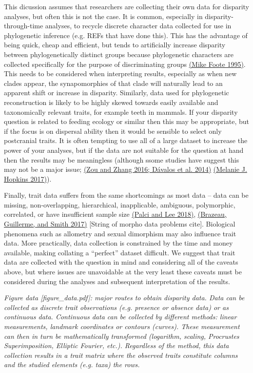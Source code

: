 This dicussion assumes that researchers are collecting their own data
for disparity analyses, but often this is not the case. It is common,
especially in disparity-through-time analyses, to recycle discrete
character data collected for use in phylogenetic inference (e.g. REFs
that have done this). This has the advantage of being quick, cheap and
efficient, but tends to artificially increase disparity between
phylogenetically distinct groups because phylogenetic characters are
collected specifically for the purpose of discriminating groups
\href{https://paperpile.com/c/sTGYvp/fTJ3}{(Mike Foote 1995)}. This
needs to be considered when interpreting results, especially as when new
clades appear, the synapomorphies of that clade will naturally lead to
an apparent shift or increase in disparity. Similarly, data used for
phylogenetic reconstruction is likely to be highly skewed towards easily
available and taxonomically relevant traits, for example teeth in
mammals. If your disparity question is related to feeding ecology or
similar then this may be appropriate, but if the focus is on dispersal
ability then it would be sensible to select only postcranial traits. It
is often tempting to use all of a large dataset to increase the power of
your analyses, but if the data are not suitable for the question at hand
then the results may be meaningless (although ssome studies have suggest
this may not be a major issue;
\href{https://paperpile.com/c/sTGYvp/ZqML+Qrba}{(Zou and Zhang 2016;
Dávalos et al. 2014)}
\href{https://paperpile.com/c/sTGYvp/xLdm}{(Melanie J. Hopkins 2017)}).

Finally, trait data suffers from the same shortcomings as most data --
data can be missing, non-overlapping, hierarchical, inapplicable,
ambiguous, polymorphic, correlated, or have insufficient sample size
\href{https://paperpile.com/c/sTGYvp/yO2t}{(Palci and Lee 2018)},
\href{https://paperpile.com/c/sTGYvp/Yrbg}{(Brazeau, Guillerme, and
Smith 2017)} {[}String of morpho data problems cite{]}. Biological
phenomena such as allometry and sexual dimorphism may also influence
trait data. More practically, data collection is constrained by the time
and money available, making collating a ``perfect'' dataset difficult.
We suggest that trait data are collected with the question in mind and
considering all of the caveats above, but where issues are unavoidable
at the very least these caveats must be considered during the analyses
and subsequent interpretation of the results.

\emph{Figure data {[}figure\_data.pdf{]}: major routes to obtain
disparity data. Data can be collected as discrete trait observations
(e.g. presence or absence data) or as continuous data. Continuous data
can be collected by different methods: linear measurements, landmark
coordinates or contours (curves). These measurement can then in turn be
mathematically transformed (logarithm, scaling, Procrustes
Superimposition, Elliptic Fourier, etc.). Regardless of the method, this
data collection results in a trait matrix where the observed traits
constitute columns and the studied elements (e.g. taxa) the rows.}

